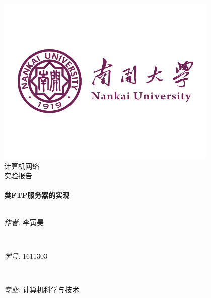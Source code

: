 \begin{titlepage}

\begin{center}


\includegraphics[width=0.8\textwidth]{figure/logoNankai}\\[1cm]

\textsc{\LARGE 计算机网络}\\[1.5cm]

\textsc{\LARGE 实验报告}\\[0.5cm]


\HRule \\[0.4cm]
{ \huge \bfseries 类FTP服务器的实现}\\[0.4cm]

\HRule \\[1.5cm]

\begin{minipage}{0.4\textwidth}
\begin{flushleft} \large
\emph{作者: }
 \textsc{李寅昊}
\end{flushleft}
\end{minipage}
\\
\begin{minipage}{0.4\textwidth}
\begin{flushleft} \large
\emph{学号: }
 \textsc{1611303}
\end{flushleft}
\end{minipage}
\\
\begin{minipage}{0.4\textwidth}
\begin{flushleft} \large
\emph{专业: }
 \textsc{计算机科学与技术}
\end{flushleft}
\end{minipage}

\vfill



\end{center}

\end{titlepage}



